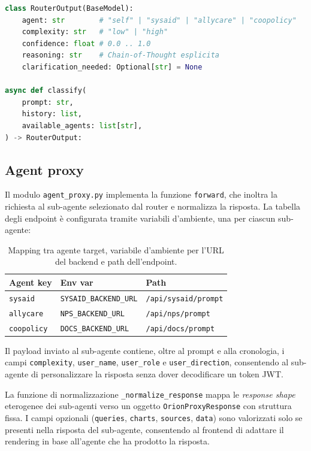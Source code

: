 \begin{lstlisting}[language=Python,caption={Firma della funzione \texttt{classify} e struttura dell'output.},label={lst:classify-signature}]
class RouterOutput(BaseModel):
    agent: str        # "self" | "sysaid" | "allycare" | "coopolicy"
    complexity: str   # "low" | "high"
    confidence: float # 0.0 .. 1.0
    reasoning: str    # Chain-of-Thought esplicita
    clarification_needed: Optional[str] = None

async def classify(
    prompt: str,
    history: list,
    available_agents: list[str],
) -> RouterOutput:
\end{lstlisting}

\subsection{Agent proxy}
\label{subsec:orion-impl-proxy}

Il modulo \texttt{agent\_proxy.py} implementa la funzione \texttt{forward}, 
che inoltra la richiesta al sub-agente selezionato dal router e normalizza la risposta. 
La tabella degli endpoint è configurata tramite variabili d'ambiente, una per ciascun sub-agente:

\begin{table}[htbp]
  \centering
  \caption[Mapping degli endpoint dei sub-agenti]{Mapping tra agente target, variabile d'ambiente per l'URL del backend e path dell'endpoint.}
  \label{tab:agent-endpoints}
  \begin{tabular}{lll}
    \toprule
    \textbf{Agent key} & \textbf{Env var}             & \textbf{Path} \\
    \midrule
    \texttt{sysaid}    & \texttt{SYSAID\_BACKEND\_URL} & \texttt{/api/sysaid/prompt} \\
    \texttt{allycare}  & \texttt{NPS\_BACKEND\_URL}    & \texttt{/api/nps/prompt} \\
    \texttt{coopolicy} & \texttt{DOCS\_BACKEND\_URL}   & \texttt{/api/docs/prompt} \\
    \bottomrule
  \end{tabular}
\end{table}

Il payload inviato al sub-agente contiene, oltre al prompt e alla cronologia, 
i campi \texttt{complexity}, \texttt{user\_name}, \texttt{user\_role} e \texttt{user\_direction}, 
consentendo al sub-agente di personalizzare la risposta senza dover decodificare un token JWT.

La funzione di normalizzazione \texttt{\_normalize\_response} mappa le \emph{response shape} 
eterogenee dei sub-agenti verso un oggetto \texttt{OrionProxyResponse} con struttura fissa. 
I campi opzionali (\texttt{queries}, \texttt{charts}, \texttt{sources}, \texttt{data}) 
sono valorizzati solo se presenti nella risposta del sub-agente, 
consentendo al frontend di adattare il rendering in base all'agente che ha prodotto la risposta.

